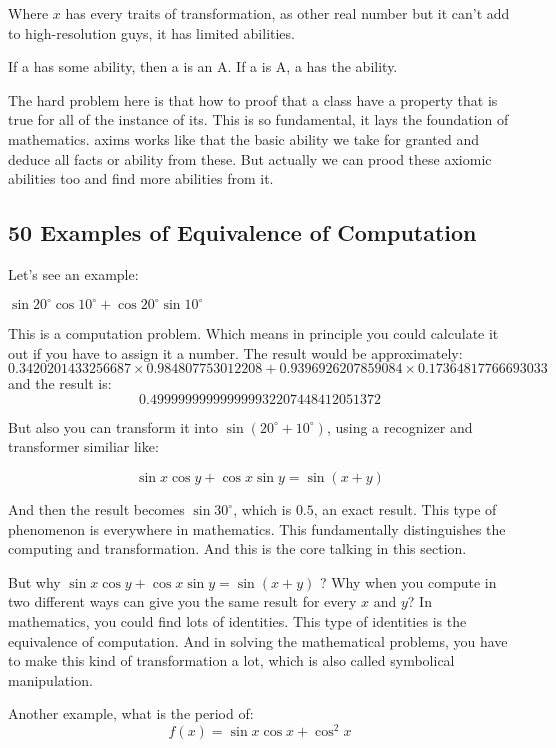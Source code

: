 Where $x$ has every traits of transformation, as other real number but it can't add to high-resolution guys, it has limited abilities.

If a has some ability, then a is an A. If a is A, a has the ability.

The hard problem here is that how to proof that a class have a property that is true for all of the instance of its. This is so fundamental, it lays the foundation of mathematics. axims works like that the basic ability we take for granted and deduce all facts or ability from these. But actually we can prood these axiomic abilities too and find more abilities from it.

\subsection{50 Examples of Equivalence of Computation}

Let's see an example:
\begin{example}
  $\sin{20^\circ}\cos{10^\circ} + \cos{20^\circ}\sin{10^\circ}$
\end{example}

This is a computation problem. Which means in principle you could calculate it out if you have to assign it a number. The result would be approximately:
\[ 0.3420201433256687 \times 0.984807753012208 + 0.9396926207859084 \times 0.17364817766693033 \]
and the result is:
\[ 0.499999999999999932207448412051372 \]

But also you can transform it into $\sin( 20^\circ + 10^\circ )$, using a recognizer and transformer similiar like:

\[ \sin{x}\cos{y} + \cos{x}\sin{y} = \sin{(x + y)} \]

And then the result becomes $\sin{30^\circ}$, which is $0.5$, an exact result. This type of phenomenon is everywhere in mathematics. This fundamentally distinguishes the computing and transformation. And this is the core talking in this section.

But why $\sin{x}\cos{y} + \cos{x}\sin{y} = \sin{(x + y)}$ ? Why when you compute in two different ways can give you the same result for every $x$ and $y$? In mathematics, you could find lots of identities. This type of identities is the equivalence of computation. And in solving the mathematical problems, you have to make this kind of transformation a lot, which is also called symbolical manipulation.

Another example, what is the period of:
\[ f(x) = \sin{x} \cos{x} + \cos^2{x} \]


